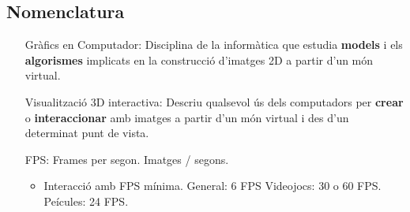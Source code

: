 \subsection{Nomenclatura}
\begin{itemize}
    \item[Gràfics en Computador:]
        Disciplina de la informàtica que estudia \textbf{models} i els \textbf{algorismes}
        implicats en la construcció d'imatges 2D a partir d'un món virtual.

    \item[Visualització 3D interactiva:]
        Descriu qualsevol ús dels computadors per \textbf{crear} o \textbf{interaccionar}
        amb imatges a partir d'un món virtual i des d'un determinat punt de vista.

    \item[FPS:] Frames per segon. Imatges / segons.
        \begin{itemize}
            \item Interacció amb FPS mínima.
                \subitem General: 6 FPS
                \subitem Videojocs: 30 o 60 FPS.
                \subitem Pe\lgem{}ícules: 24 FPS.
        \end{itemize}


\end{itemize}

